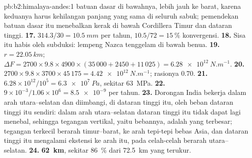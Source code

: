 \begin{solution}{pb:b2:himalaya-andes:1}
batuan dasar di bawahnya, lebih jauh ke barat, karena keduanya harus kehilangan panjang yang sama di seluruh sabuk; pemendekan batuan dasar
itu menebalkan kerak di bawah Cordillera Timur dan dataran tinggi.
\textbf{17.} $314.3/30 = \qty{10.5}{mm}$ per tahun, $10.5/72 = \qty{15}{\percent}$
konvergensi.
\textbf{18.} Sisa itu habis oleh subduksi: lempeng Nazca tenggelam di bawah benua.
\textbf{19.} $r = \qty{22.05}{km}$; $\Delta F = 2700\times9.8\times4900\times(35\,000 + 2450
+ 11\,025) = \qty{6.28e12}{N.m^{-1}}$.
\textbf{20.} $2700\times9.8\times3700\times45\,175 = \qty{4.42e12}{N.m^{-1}}$; rasionya
0.70.
\textbf{21.} $6.28\times10^{12}/10^{5} = \qty{6.3e7}{Pa}$, sekitar \qty{63}{MPa}.
\textbf{22.} $9\times10^{-3}/1.06\times10^{6} = \num{8.5e-9}$ per tahun.
\textbf{23.} Dorongan India bekerja dalam arah utara--selatan dan diimbangi, di dataran tinggi itu, oleh
beban dataran tinggi itu sendiri: dalam arah utara--selatan dataran tinggi itu tidak dapat lagi menebal, sehingga tegangan vertikal,
yaitu bebannya, adalah yang terbesar; tegangan terkecil berarah timur--barat, ke arah tepi-tepi bebas Asia,
dan dataran tinggi itu mengalami ekstensi ke arah itu, pada celah-celah berarah utara--selatan.
\textbf{24.} \textbf{\qty[text-series-to-math=true]{62}{km}}, sekitar \qty{86}{\percent}
dari \qty{72.5}{km} yang terukur.
\end{solution}
